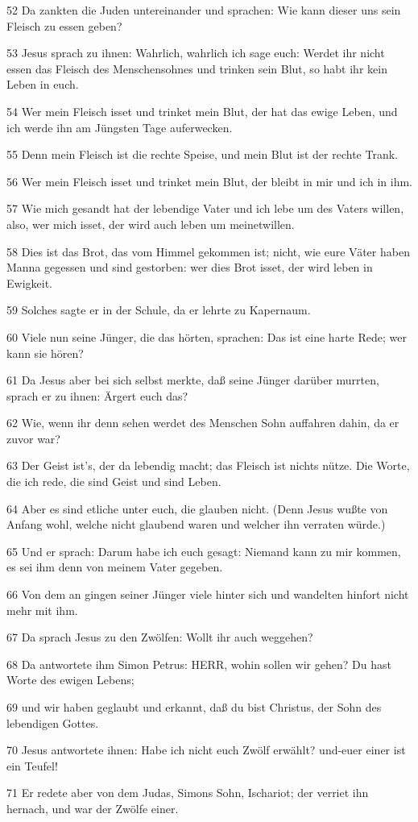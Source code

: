 \par 52 Da zankten die Juden untereinander und sprachen: Wie kann dieser uns sein Fleisch zu essen geben?
\par 53 Jesus sprach zu ihnen: Wahrlich, wahrlich ich sage euch: Werdet ihr nicht essen das Fleisch des Menschensohnes und trinken sein Blut, so habt ihr kein Leben in euch.
\par 54 Wer mein Fleisch isset und trinket mein Blut, der hat das ewige Leben, und ich werde ihn am Jüngsten Tage auferwecken.
\par 55 Denn mein Fleisch ist die rechte Speise, und mein Blut ist der rechte Trank.
\par 56 Wer mein Fleisch isset und trinket mein Blut, der bleibt in mir und ich in ihm.
\par 57 Wie mich gesandt hat der lebendige Vater und ich lebe um des Vaters willen, also, wer mich isset, der wird auch leben um meinetwillen.
\par 58 Dies ist das Brot, das vom Himmel gekommen ist; nicht, wie eure Väter haben Manna gegessen und sind gestorben: wer dies Brot isset, der wird leben in Ewigkeit.
\par 59 Solches sagte er in der Schule, da er lehrte zu Kapernaum.
\par 60 Viele nun seine Jünger, die das hörten, sprachen: Das ist eine harte Rede; wer kann sie hören?
\par 61 Da Jesus aber bei sich selbst merkte, daß seine Jünger darüber murrten, sprach er zu ihnen: Ärgert euch das?
\par 62 Wie, wenn ihr denn sehen werdet des Menschen Sohn auffahren dahin, da er zuvor war?
\par 63 Der Geist ist's, der da lebendig macht; das Fleisch ist nichts nütze. Die Worte, die ich rede, die sind Geist und sind Leben.
\par 64 Aber es sind etliche unter euch, die glauben nicht. (Denn Jesus wußte von Anfang wohl, welche nicht glaubend waren und welcher ihn verraten würde.)
\par 65 Und er sprach: Darum habe ich euch gesagt: Niemand kann zu mir kommen, es sei ihm denn von meinem Vater gegeben.
\par 66 Von dem an gingen seiner Jünger viele hinter sich und wandelten hinfort nicht mehr mit ihm.
\par 67 Da sprach Jesus zu den Zwölfen: Wollt ihr auch weggehen?
\par 68 Da antwortete ihm Simon Petrus: HERR, wohin sollen wir gehen? Du hast Worte des ewigen Lebens;
\par 69 und wir haben geglaubt und erkannt, daß du bist Christus, der Sohn des lebendigen Gottes.
\par 70 Jesus antwortete ihnen: Habe ich nicht euch Zwölf erwählt? und-euer einer ist ein Teufel!
\par 71 Er redete aber von dem Judas, Simons Sohn, Ischariot; der verriet ihn hernach, und war der Zwölfe einer.

